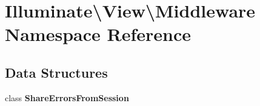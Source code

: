 \section{Illuminate\textbackslash{}View\textbackslash{}Middleware Namespace Reference}
\label{namespace_illuminate_1_1_view_1_1_middleware}
\subsection*{Data Structures}
\begin{DoxyCompactItemize}
\item 
class {\bf Share\+Errors\+From\+Session}
\end{DoxyCompactItemize}
